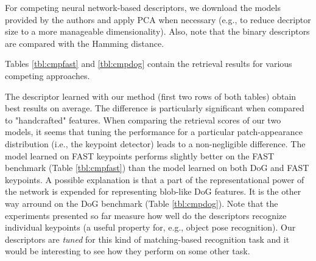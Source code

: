 \documentclass[10pt,conference,a4paper]{IEEEtran}
\begin{document}
			For competing neural network-based descriptors, we download the models provided by the authors and apply PCA when necessary
			(e.g., to reduce decriptor size to a more manageable dimensionality).
			Also, note that the binary descriptors are compared with the Hamming distance.

			Tables \ref{tbl:cmpfast} and \ref{tbl:cmpdog} contain the retrieval results for various competing approaches.
			
			The descriptor learned with our method (first two rows of both tables) obtain best results on average.
			The difference is particularly significant when compared to "handcrafted" features.
			When comparing the retrieval scores of our two models, it seems that tuning the performance for a particular patch-appearance distribution (i.e., the keypoint detector) leads to a non-negligible difference.
			The model learned on FAST keypoints performs slightly better on the FAST benchmark (Table \ref{tbl:cmpfast}) than the model learned on both DoG and FAST keypoints.
			A possible explanation is that a part of the representational power of the network is expended for representing blob-like DoG features.
			It is the other way arround on the DoG benchmark (Table \ref{tbl:cmpdog}).
			Note that the experiments presented so far measure how well do the descriptors recognize individual keypoints (a useful property for, e.g., object pose recognition).
			Our descriptors are \textit{tuned} for this kind of matching-based recognition task and it would be interesting to see how they perform on some other task.
\end{document}
